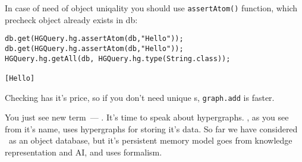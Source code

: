 In case of need of object uniqality you should use \verb$assertAtom()$ function,
which precheck object already exists in db:
\begin{verbatim}
db.get(HGQuery.hg.assertAtom(db,"Hello"));
db.get(HGQuery.hg.assertAtom(db,"Hello"));
HGQuery.hg.getAll(db, HGQuery.hg.type(String.class));

[Hello]
\end{verbatim}
Checking has it's price, so if you don't need unique s,
\verb$graph.add$ is faster.


You just see new term\ --- . It's time to speak about hypergraphs.
\hgdb, as you see from it's name, uses hypergraphs for storing it's data. So far
we have considered \hgdb\ as an object database, but it's persistent memory
model goes from knowledge representation and AI, and uses  formalism.

\secup
